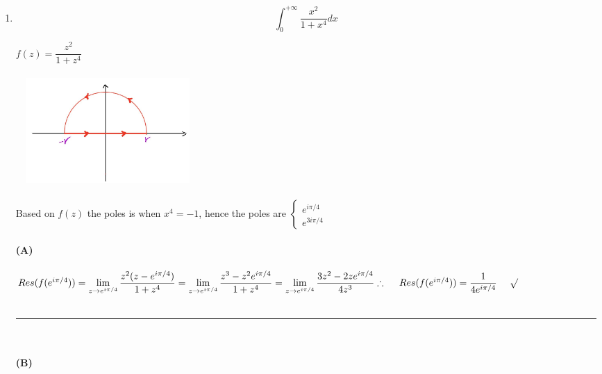 \documentclass[fleqn]{article}
\begin{document}
\begin{enumerate}
\begin{enumerate}
      \item $$ \int^{+\infty}_{0} \frac{ x^2}{1+x^4}dx$$
      
        \textcolor{hwColor}{
          $
            f(z)=\dfrac{z^2}{1+z^4} 
          $
          \\
          \\
          \includegraphics[height=4cm, width=7cm]{Capture.JPG}
          \\
          \\
          Based on $f(z)$ the poles is when $x^4=-1$, hence the poles are $
          \begin{cases}
            e^{i \pi/4}
            \\
            e^{3 i \pi/ 4} 
          \end{cases}
          $
          \\
          \\
          \textbf{(A)}
          \\
          \\
          $
            Res(f(e^{i \pi/4}))=\lim\limits_{z \to e^{i \pi/4}} \dfrac{z^2(z-e^{i \pi/4})}{1+z^4}
            \\
            \\
            =\lim\limits_{z \to e^{i \pi/4}} \dfrac{z^3-z^2 e^{i \pi/4}}{1+z^4}
            \\
            \\
            =\lim\limits_{z \to e^{i \pi/4}} \dfrac{3z^2-2ze^{i \pi/4}}{4z^3}
            \\
            \\
            \\
            \therefore ~~~~ Res(f(e^{i \pi/4}))=\dfrac{1}{4 e^{i \pi/4}} ~~~~ \surd
          $
          \\
          \\
          \rule{15cm}{1pt}
          \\
          \\
          \textbf{(B)}
          \\
          \\
}
\end{enumerate}
\end{enumerate}
\end{document}
